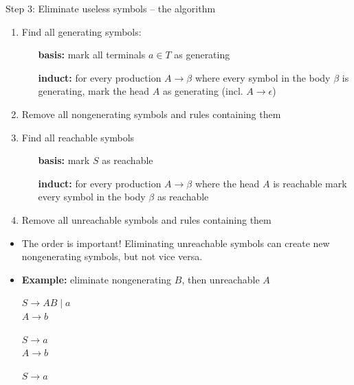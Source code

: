 \documentclass[handout]{beamer}
\begin{document}
\begin{frame}{Step 3: Eliminate useless symbols -- the algorithm}

	\begin{enumerate}
		\item Find all generating symbols:
		\begin{itemize}
			\item[\textbf{basis:}] mark all terminals $a\in T$ as generating
			\item[\textbf{induct:}] for every production $A\rightarrow\beta$ where every symbol in the body $\beta$ is generating, mark the head $A$ as generating (incl. $A\rightarrow \epsilon$)
		\end{itemize}
		\item Remove all \alert{nongenerating} symbols and rules containing them
		\item Find all reachable symbols
		\begin{itemize}
			\item[\textbf{basis:}] mark $S$ as reachable
			\item[\textbf{induct:}] for every production $A\rightarrow\beta$ where the head $A$ is reachable mark every symbol in the body $\beta$ as reachable
		\end{itemize}
		\item Remove all \alert{unreachable} symbols and rules containing them		
	\end{enumerate}

	\begin{itemize}
		\item The order is important! Eliminating unreachable symbols can create new nongenerating symbols, but not vice versa.
		\item \textbf{Example:} eliminate nongenerating $B$, then unreachable $A$
		\smallskip
		\begin{center}
			\begin{minipage}{0.25\textwidth}
				$S\rightarrow AB\mid a$\\
				$A\rightarrow b$
			\end{minipage}
			\begin{minipage}{0.25\textwidth}
				$S\rightarrow a$\\
				$A\rightarrow b$
			\end{minipage}
			\begin{minipage}{0.25\textwidth}
				$S\rightarrow a$
			\end{minipage}
		\end{center}
	\end{itemize}

\end{frame}
\end{document}
